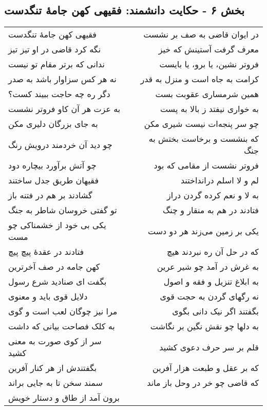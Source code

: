 \begin{center}
\section*{بخش ۶ - حکایت دانشمند: فقیهی کهن جامهٔ تنگدست}
\label{sec:006}
\begin{longtable}{l p{0.5cm} r}
فقیهی کهن جامهٔ تنگدست
&&
در ایوان قاضی به صف بر نشست
\\
نگه کرد قاضی در او تیز تیز
&&
معرف گرفت آستینش که خیز
\\
ندانی که برتر مقام تو نیست
&&
فروتر نشین، یا برو، یا بایست
\\
نه هر کس سزاوار باشد به صدر
&&
کرامت به جاه است و منزل به قدر
\\
دگر ره چه حاجت ببیند کست؟
&&
همین شرمساری عقوبت بست
\\
به عزت هر آن کاو فروتر نشست
&&
به خواری نیفتد ز بالا به پست
\\
به جای بزرگان دلیری مکن
&&
چو سر پنجه‌ات نیست شیری مکن
\\
چو دید آن خردمند درویش رنگ
&&
که بنشست و برخاست بختش به جنگ
\\
چو آتش برآورد بیچاره دود
&&
فروتر نشست از مقامی که بود
\\
فقیهان طریق جدل ساختند
&&
لم و لا اسلم درانداختند
\\
گشادند بر هم در فتنه باز
&&
به لا و نعم کرده گردن دراز
\\
تو گفتی خروسان شاطر به جنگ
&&
فتادند در هم به منقار و چنگ
\\
یکی بی خود از خشمناکی چو مست
&&
یکی بر زمین می‌زند هر دو دست
\\
فتادند در عقدهٔ پیچ پیچ
&&
که در حل آن ره نبردند هیچ
\\
کهن جامه در صف آخرترین
&&
به غرش در آمد چو شیر عرین
\\
بگفت ای صنادید شرع رسول
&&
به ابلاغ تنزیل و فقه و اصول
\\
دلایل قوی باید و معنوی
&&
نه رگهای گردن به حجت قوی
\\
مرا نیز چوگان لعب است و گوی
&&
بگفتند اگر نیک دانی بگوی
\\
به کلک فصاحت بیانی که داشت
&&
به دلها چو نقش نگین بر نگاشت
\\
سر از کوی صورت به معنی کشید
&&
قلم بر سر حرف دعوی کشید
\\
بگفتندش از هر کنار آفرین
&&
که بر عقل و طبعت هزار آفرین
\\
سمند سخن تا به جایی براند
&&
که قاضی چو خر در وحل باز ماند
\\
برون آمد از طاق و دستار خویش

\end{longtable}
\end{center}
